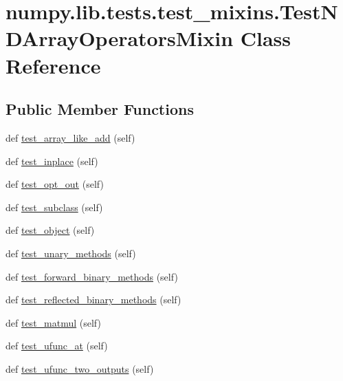 \hypertarget{classnumpy_1_1lib_1_1tests_1_1test__mixins_1_1TestNDArrayOperatorsMixin}{}\section{numpy.\+lib.\+tests.\+test\+\_\+mixins.\+Test\+N\+D\+Array\+Operators\+Mixin Class Reference}
\label{classnumpy_1_1lib_1_1tests_1_1test__mixins_1_1TestNDArrayOperatorsMixin}
\subsection*{Public Member Functions}
\begin{DoxyCompactItemize}
\item 
def \hyperlink{classnumpy_1_1lib_1_1tests_1_1test__mixins_1_1TestNDArrayOperatorsMixin_a5da77c5aa42fd6f0da4863d6d8387a94}{test\+\_\+array\+\_\+like\+\_\+add} (self)
\item 
def \hyperlink{classnumpy_1_1lib_1_1tests_1_1test__mixins_1_1TestNDArrayOperatorsMixin_ac29cd20752bb3bb408a82dd76f310af7}{test\+\_\+inplace} (self)
\item 
def \hyperlink{classnumpy_1_1lib_1_1tests_1_1test__mixins_1_1TestNDArrayOperatorsMixin_acc7ac5950eb8d637e6befcfe4eb76c2d}{test\+\_\+opt\+\_\+out} (self)
\item 
def \hyperlink{classnumpy_1_1lib_1_1tests_1_1test__mixins_1_1TestNDArrayOperatorsMixin_a4b933ad10ea8ee2e345995ee8deb5d25}{test\+\_\+subclass} (self)
\item 
def \hyperlink{classnumpy_1_1lib_1_1tests_1_1test__mixins_1_1TestNDArrayOperatorsMixin_a5f872a0da689cf4900ca883db89357b0}{test\+\_\+object} (self)
\item 
def \hyperlink{classnumpy_1_1lib_1_1tests_1_1test__mixins_1_1TestNDArrayOperatorsMixin_a0146a1bbd690234183d06fe7131d8d32}{test\+\_\+unary\+\_\+methods} (self)
\item 
def \hyperlink{classnumpy_1_1lib_1_1tests_1_1test__mixins_1_1TestNDArrayOperatorsMixin_af1d12018901ff3c0535b4ace55d623b2}{test\+\_\+forward\+\_\+binary\+\_\+methods} (self)
\item 
def \hyperlink{classnumpy_1_1lib_1_1tests_1_1test__mixins_1_1TestNDArrayOperatorsMixin_a76bee405a5059f6f42ec714390f4e59f}{test\+\_\+reflected\+\_\+binary\+\_\+methods} (self)
\item 
def \hyperlink{classnumpy_1_1lib_1_1tests_1_1test__mixins_1_1TestNDArrayOperatorsMixin_a39b0749f7ffd952ebcbc2fa13df550a7}{test\+\_\+matmul} (self)
\item 
def \hyperlink{classnumpy_1_1lib_1_1tests_1_1test__mixins_1_1TestNDArrayOperatorsMixin_ae1facab8e9bf208768357a847cf62e46}{test\+\_\+ufunc\+\_\+at} (self)
\item 
def \hyperlink{classnumpy_1_1lib_1_1tests_1_1test__mixins_1_1TestNDArrayOperatorsMixin_a73f3e304449c28a69f978b290beb865d}{test\+\_\+ufunc\+\_\+two\+\_\+outputs} (self)
\end{DoxyCompactItemize}


